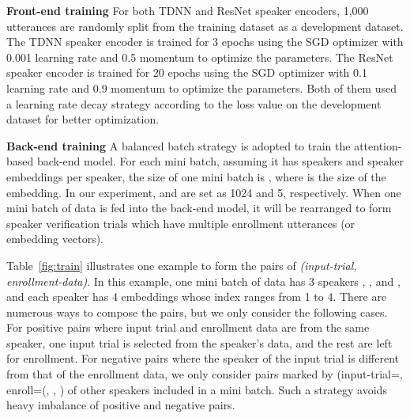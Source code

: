 \documentclass[a4paper]{article}
\newcommand{\PTrial}{}
\newcommand{\Penroll}{}
\newcommand{\NTrial}{\textcolor{red}{}}
\newcommand{\Nenroll}{}
\begin{document}
\begin{comment}
 & & 2 & \Nenroll  & \NTrial  & \Nenroll & \Nenroll  & \Nenroll & \NTrial   & \Nenroll & \Nenroll & \Penroll & \PTrial  & \Penroll & \Penroll \\
 & & 3 & \Nenroll  & \Nenroll & \NTrial  & \Nenroll  & \Nenroll & \Nenroll  & \NTrial  & \Nenroll & \Penroll & \Penroll & \PTrial  & \Penroll \\
 & & 4 & \Nenroll  & \Nenroll & \Nenroll & \NTrial   & \Nenroll & \Nenroll  & \Nenroll & \NTrial  & \Penroll & \Penroll & \Penroll & \PTrial  \\
 \cmidrule{2-15}
 \vspace{-5mm}
\end{tabular}
}
    \label{fig:train}
\end{table}

\begin{figure}
    \centering
    \texttt{[image: training\_methodology.pdf]}
    \caption{Training methodology of back-end model}
    \label{fig:train}
\end{figure}
\vspace{-3mm}
\end{comment}



\noindent 
\textbf{Front-end training}
For both TDNN and ResNet speaker encoders, 1,000 utterances are randomly split from the training dataset as a development dataset. The TDNN speaker encoder is trained for 3 epochs using the SGD optimizer with 0.001 learning rate and 0.5 momentum to optimize the parameters. The ResNet speaker encoder is trained for 20 epochs using the SGD optimizer with 0.1 learning rate and 0.9 momentum to optimize the parameters. Both of them used a learning rate decay strategy according to the loss value on the development dataset for better optimization.

\noindent 
\textbf{Back-end training}
A balanced batch strategy is adopted to train the attention-based back-end model. For each mini batch, assuming it has  speakers and  speaker embeddings per speaker, the size of one mini batch is , where  is the size of the embedding. In our experiment,  and  are set as 1024 and 5, respectively. When one mini batch of data is fed into the back-end model, it will be rearranged to form speaker verification trials which have multiple enrollment utterances (or embedding vectors). 

Table~\ref{fig:train} illustrates one example to form the pairs of \textit{(input-trial, enrollment-data)}. In this example, one mini batch of data has 3 speakers , , and , and each speaker has 4 embeddings whose index ranges from 1 to 4. 
There are numerous ways to compose the pairs, but we only consider the following cases. 
For positive pairs where input trial and enrollment data are from the same speaker, one input trial is selected from the speaker's data, and the rest are left for enrollment. 
For negative pairs where the speaker of the input trial is different from that of the enrollment data, we only consider pairs marked by (input-trial=\PTrial, enroll=(\Nenroll, \Nenroll, \Nenroll) of other speakers included in a mini batch. Such a strategy avoids heavy imbalance of positive and negative pairs.
\end{document}
